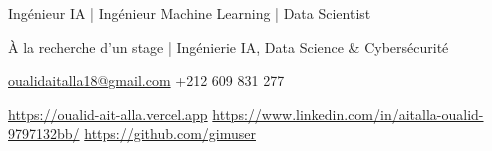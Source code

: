 {{\begin{center}
{           {Ingénieur IA | Ingénieur Machine Learning | Data Scientist}\par}
      \vspace{1pt}
      {\fontsize{9}{10.5}\selectfont
           {À la recherche d’un stage | Ingénierie IA, Data Science \& Cybersécurité}\par}
      \vspace{2pt}
      {\color{cvcharcoal}\fontsize{8.8}{10}\selectfont
        \quad\ContactSep\quad \href{mailto:oualidaitalla18@gmail.com}{oualidaitalla18@gmail.com}
        \quad\ContactSep\quad +212 609 831 277\par}
      {\color{cvcharcoal}\fontsize{8.6}{9.8}\selectfont
        \url{https://oualid-ait-alla.vercel.app}
        \quad\ContactSep\quad \url{https://www.linkedin.com/in/aitalla-oualid-9797132bb/}
        \quad\ContactSep\quad \url{https://github.com/gimuser}\par}
    \end{center}
    \vspace{2pt}
  }%
}
